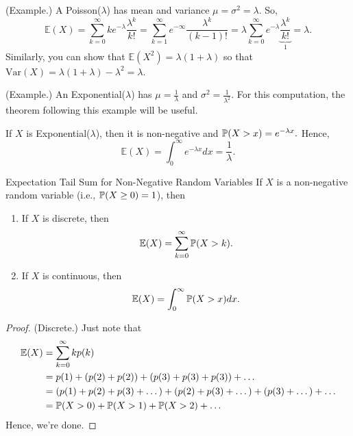 \begin{mdframed}[]
    (Example.) A Poisson($\lambda$) has mean and variance $\mu = \sigma^2 = \lambda$. So, 
    \[\mathbb{E}(X) = \sum_{k = 0}^{\infty} ke^{-\lambda} \frac{\lambda^k}{k!} = \sum_{k = 1}^{\infty} e^{-\infty} \frac{\lambda^k}{(k - 1)!} = \lambda \sum_{k = 0}^{\infty} e^{-\lambda} \underbrace{\frac{\lambda^k}{k!}}_{1} = \lambda.\]
    Similarly, you can show that $\mathbb{E}(X^2) = \lambda(1 + \lambda)$ so that $\text{Var}(X) = \lambda(1 + \lambda) - \lambda^2 = \lambda$. 
\end{mdframed}

\begin{mdframed}[]
    (Example.) An Exponential($\lambda$) has $\mu = \frac{1}{\lambda}$ and $\sigma^2 = \frac{1}{\lambda^2}$. For this computation, the theorem following this example will be useful. 

    \bigskip 
    
    If $X$ is Exponential($\lambda$), then it is non-negative and $\mathbb{P}(X > x) = e^{-\lambda x}.$ Hence, 
    \[\mathbb{E}(X) = \int_{0}^{\infty} e^{-\lambda x} dx = \frac{1}{\lambda}.\]
\end{mdframed}

\begin{theorem}{Expectation Tail Sum for Non-Negative Random Variables}{}
    If $X$ is a non-negative random variable (i.e., $\mathbb{P}(X \geq 0) = 1$), then 
    \begin{enumerate}
        \item If $X$ is discrete, then 
        \[\mathbb{E}(X) = \sum_{k = 0}^{\infty} \mathbb{P}(X > k).\]

        \item If $X$ is continuous, then 
        \[\mathbb{E}(X) = \int_{0}^{\infty} \mathbb{P}(X > x) dx.\]
    \end{enumerate}
\end{theorem}

\begin{mdframed}[]
    \begin{proof}
        (Discrete.) Just note that 
        \begin{equation*}
            \begin{aligned}
                \mathbb{E}(X) &= \sum_{k = 0}^{\infty} kp(k) \\ 
                    &= p(1) + (p(2) + p(2)) + (p(3) + p(3) + p(3)) + \dots \\ 
                    &= (p(1) + p(2) + p(3) + \dots) + (p(2) + p(3) + \dots) + (p(3) + \dots) + \dots \\
                    &= \mathbb{P}(X > 0) + \mathbb{P}(X > 1) + \mathbb{P}(X > 2) + \dots
            \end{aligned}
        \end{equation*}
        Hence, we're done.
    \end{proof}
\end{mdframed}

